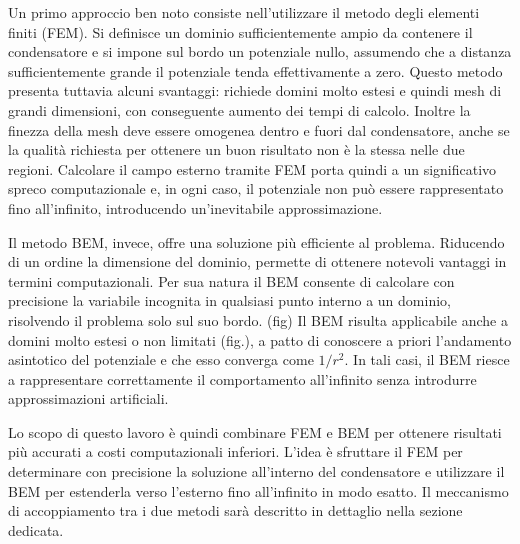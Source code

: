 \documentclass[11pt,onecolumn]{article}
\begin{document}
\begin{appendices}
Un primo approccio ben noto consiste nell’utilizzare il metodo degli elementi finiti (FEM). Si definisce un dominio sufficientemente ampio da contenere il condensatore e si impone sul bordo un potenziale nullo, assumendo che a distanza sufficientemente grande il potenziale tenda effettivamente a zero. Questo metodo presenta tuttavia alcuni svantaggi: richiede domini molto estesi e quindi mesh di grandi dimensioni, con conseguente aumento dei tempi di calcolo. Inoltre la finezza della mesh deve essere omogenea dentro e fuori dal condensatore, anche se la qualità richiesta per ottenere un buon risultato non è la stessa nelle due regioni. Calcolare il campo esterno tramite FEM porta quindi a un significativo spreco computazionale e, in ogni caso, il potenziale non può essere rappresentato fino all’infinito, introducendo un’inevitabile approssimazione.

Il metodo BEM, invece, offre una soluzione più efficiente al problema. Riducendo di un ordine la dimensione del dominio, permette di ottenere notevoli vantaggi in termini computazionali. Per sua natura il BEM consente di calcolare con precisione la variabile incognita in qualsiasi punto interno a un dominio, risolvendo il problema solo sul suo bordo. (fig) Il BEM risulta applicabile anche a domini molto estesi o non limitati (fig.), a patto di conoscere a priori l’andamento asintotico del potenziale e che esso converga come $1/r^2$. In tali casi, il BEM riesce a rappresentare correttamente il comportamento all’infinito senza introdurre approssimazioni artificiali.

Lo scopo di questo lavoro è quindi combinare FEM e BEM per ottenere risultati più accurati a costi computazionali inferiori. L’idea è sfruttare il FEM per determinare con precisione la soluzione all’interno del condensatore e utilizzare il BEM per estenderla verso l’esterno fino all’infinito in modo esatto. Il meccanismo di accoppiamento tra i due metodi sarà descritto in dettaglio nella sezione dedicata.


\end{appendices}
\end{document}
